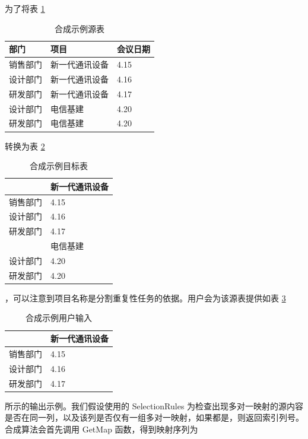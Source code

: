 \documentclass[design, pageheader]{njubachelor}
\begin{document}
为了将表 \ref{table:example_source}
\begin{table}[!htbp]
    \centering   
    \begin{tabular}{|l|l|l|}
    \hline
    部门 & 项目 & 会议日期  \\ \hline
    销售部门  & 新一代通讯设备 & 4.15      \\ \hline
    设计部门   & 新一代通讯设备 & 4.16   \\ \hline
    研发部门  & 新一代通讯设备 & 4.17 \\ \hline
    设计部门  & 电信基建    & 4.20     \\ \hline
    研发部门   & 电信基建    & 4.20    \\ \hline
    \end{tabular}
    \caption{合成示例源表}
    \label{table:example_source}
\end{table}
转换为表 \ref{table:example_target}
\begin{table}[!htbp] 
    \centering   
    \begin{tabular}{|l|l|}
    \hline
     & 新一代通讯设备 \\ \hline
    销售部门   & 4.15      \\ \hline
    设计部门   & 4.16   \\ \hline
    研发部门   & 4.17 \\ \hline
    & 电信基建 \\ \hline
    设计部门   & 4.20     \\ \hline
    研发部门   & 4.20    \\ \hline
    \end{tabular}
    \caption{合成示例目标表}
    \label{table:example_target}
\end{table}，可以注意到项目名称是分割重复性任务的依据。用户会为该源表提供如表 \ref{table:example_target_example}
\begin{table}[!htbp] 
    \centering   
    \begin{tabular}{|l|l|}
    \hline
     & 新一代通讯设备 \\ \hline
    销售部门   & 4.15      \\ \hline
    设计部门   & 4.16   \\ \hline
    研发部门   & 4.17 \\ \hline
    \end{tabular}
    \caption{合成示例用户输入}
    \label{table:example_target_example}
\end{table}所示的输出示例。我们假设使用的 SelectionRules 为检查出现多对一映射的源内容是否在同一列，以及该列是否仅有一组多对一映射，如果都是，则返回索引列号。合成算法会首先调用 GetMap 函数，得到映射序列为
\end{document}
